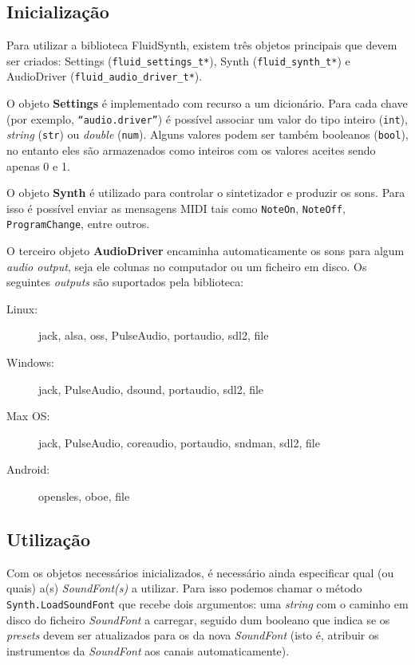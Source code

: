 \documentclass[
  oneside,
  11pt, a4paper,
  footinclude=true,
  headinclude=true,
  cleardoublepage=empty
]{scrbook}
\begin{document}
\subsection{Inicialização}
Para utilizar a biblioteca FluidSynth, existem três objetos principais que devem ser criados: Settings (\texttt{fluid\_settings\_t*}), Synth (\texttt{fluid\_synth\_t*}) e AudioDriver (\texttt{fluid\_audio\_driver\_t*}).

O objeto \textbf{Settings}\cite{fluidsynth_settings} é implementado com recurso a um dicionário. Para cada chave (por exemplo, \texttt{``audio.driver''}) é possível associar um valor do tipo inteiro (\texttt{int}), \textit{string} (\texttt{str}) ou \textit{double} (\texttt{num}). Alguns valores podem ser também booleanos (\texttt{bool}), no entanto eles são armazenados como inteiros com os valores aceites sendo apenas 0 e 1.

O objeto \textbf{Synth} é utilizado para controlar o sintetizador e produzir os sons. Para isso é possível enviar as mensagens MIDI tais como \texttt{NoteOn}, \texttt{NoteOff}, \texttt{ProgramChange}, entre outros.

O terceiro objeto \textbf{AudioDriver} encaminha automaticamente os sons para algum \textit{audio output}, seja ele colunas no computador ou um ficheiro em disco. Os seguintes \textit{outputs} são suportados pela biblioteca:

\begin{adjustwidth}{20pt}{20pt}
\begin{description}
    \item[Linux:] jack, alsa, oss, PulseAudio, portaudio, sdl2, file
    \item[Windows:] jack, PulseAudio, dsound, portaudio, sdl2, file
    \item[Max OS:] jack, PulseAudio, coreaudio, portaudio, sndman, sdl2, file
    \item[Android:] opensles, oboe, file
\end{description}
\end{adjustwidth}

\subsection{Utilização}
Com os objetos necessários inicializados, é necessário ainda especificar qual (ou quais) a(s) \textit{SoundFont(s)} a utilizar. Para isso podemos chamar o método \texttt{Synth.LoadSoundFont} que recebe dois argumentos: uma \textit{string} com o caminho em disco do ficheiro \textit{SoundFont} a carregar, seguido dum booleano que indica se os \textit{presets} devem ser atualizados para os da nova \textit{SoundFont} (isto é, atribuir os instrumentos da \textit{SoundFont} aos canais automaticamente).
\end{document}
